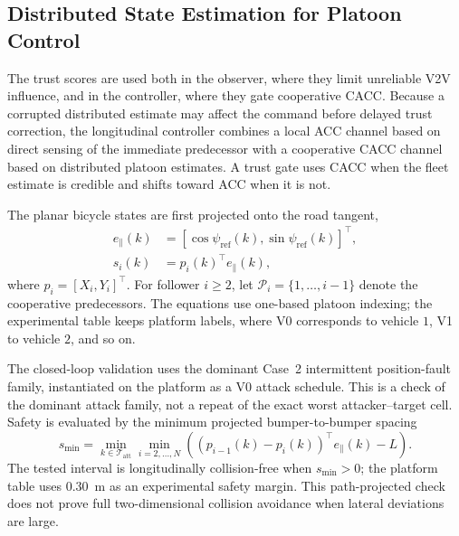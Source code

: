 \documentclass[letterpaper,journal]{IEEEtran}
\begin{document}
\subsection{Distributed State Estimation for Platoon Control}

The trust scores are used both in the observer, where they limit unreliable V2V influence, and in the controller, where they gate cooperative CACC. Because a corrupted distributed estimate may affect the command before delayed trust correction, the longitudinal controller combines a local ACC channel based on direct sensing of the immediate predecessor with a cooperative CACC channel based on distributed platoon estimates. A trust gate uses CACC when the fleet estimate is credible and shifts toward ACC when it is not.

The planar bicycle states are first projected onto the road tangent,
\begin{align}
    e_{\parallel}(k)&=[\cos\psi_{\mathrm{ref}}(k),\sin\psi_{\mathrm{ref}}(k)]^\top,\\
    s_i(k)&=p_i(k)^\top e_{\parallel}(k),
\end{align}
where $p_i=[X_i,Y_i]^\top$. For follower $i\ge2$, let $\mathcal{P}_i=\{1,\ldots,i-1\}$ denote the cooperative predecessors. The equations use one-based platoon indexing; the experimental table keeps platform labels, where V0 corresponds to vehicle $1$, V1 to vehicle $2$, and so on.

The closed-loop validation uses the dominant Case~2 intermittent position-fault family, instantiated on the platform as a V0 attack schedule. This is a check of the dominant attack family, not a repeat of the exact worst attacker--target cell. Safety is evaluated by the minimum projected bumper-to-bumper spacing
\begin{equation}
    s_{\min}=\min_{k\in\mathcal{T}_{\mathrm{att}}}\min_{i=2,\ldots,N}
    \left((p_{i-1}(k)-p_i(k))^\top e_{\parallel}(k)-L\right).
\end{equation}
The tested interval is longitudinally collision-free when $s_{\min}>0$; the platform table uses $0.30$~m as an experimental safety margin. This path-projected check does not prove full two-dimensional collision avoidance when lateral deviations are large.
\end{document}
